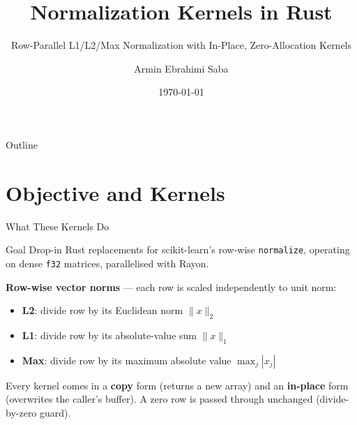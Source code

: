 \documentclass[aspectratio=169]{beamer}
\title{Normalization Kernels in Rust}
\subtitle{Row-Parallel L1/L2/Max Normalization with In-Place, Zero-Allocation Kernels}
\author{Armin Ebrahimi Saba}
\date{\today}
\begin{document}
\begin{frame}
  \titlepage
\end{frame}

\begin{frame}{Outline}
  \tableofcontents
\end{frame}

\section{Objective and Kernels}

\begin{frame}{What These Kernels Do}
  \begin{block}{Goal}
    Drop-in Rust replacements for scikit-learn's row-wise \texttt{normalize},
    operating on dense \texttt{f32} matrices, parallelised with Rayon.
  \end{block}
  \vspace{0.4em}
  \textbf{Row-wise vector norms} — each row is scaled independently to unit norm:
  \begin{itemize}
    \item \textbf{L2}: divide row by its Euclidean norm $\|x\|_2$
    \item \textbf{L1}: divide row by its absolute-value sum $\|x\|_1$
    \item \textbf{Max}: divide row by its maximum absolute value $\max_j|x_j|$
  \end{itemize}
  \vspace{0.5em}
  Every kernel comes in a \textbf{copy} form (returns a new array) and an
  \textbf{in-place} form (overwrites the caller's buffer). A zero row is passed
  through unchanged (divide-by-zero guard).
\end{frame}
\end{document}
